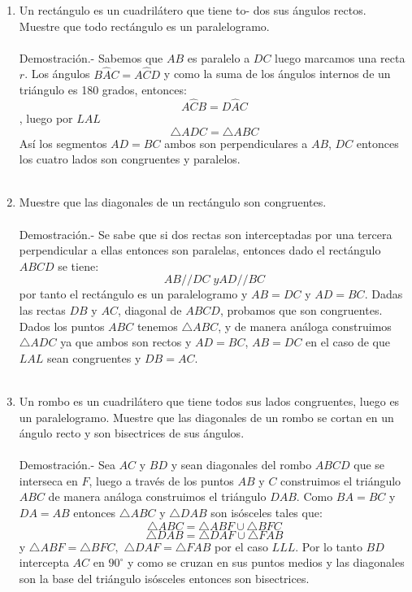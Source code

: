 \documentclass[10pt]{article}
\begin{document}
\begin{enumerate}
\item Un rectángulo es un cuadrilátero que tiene to- dos sus ángulos rectos. Muestre que todo rectángulo es un paralelogramo.\\\\
    Demostración.-\; Sabemos que $AB$ es paralelo a $DC$ luego marcamos una recta $r$. Los ángulos $B\widehat{A}C=A\widehat{C}D$ y como la suma de los ángulos internos de un triángulo es 180 grados, entonces: $$A\widehat{C}B=D\widehat{A}C$$, luego por $LAL$ $$\triangle ADC = \triangle ABC$$ Así los segmentos $AD = BC$  ambos son perpendiculares a $AB$, $DC$ entonces los cuatro lados son congruentes y paralelos.\\\\

\item Muestre que las diagonales de un rectángulo son congruentes.\\\\
    Demostración.-\; Se sabe que si dos rectas son interceptadas por una tercera perpendicular a ellas entonces son paralelas, entonces dado el rectángulo $ABCD$ se tiene: $$AB//DC \; y AD//BC$$ por tanto el rectángulo es un paralelogramo y $AB = DC$ y $AD = BC.$ Dadas las rectas $DB$ y $AC$, diagonal de $ABCD$, probamos que son congruentes.\\
    Dados los puntos $ABC$ tenemos $\triangle ABC$, y de manera análoga construimos $\triangle ADC$ ya que ambos son rectos y $AD = BC$, $AB = DC$ en el caso de que $LAL$ sean congruentes y $DB = AC$.\\\\

\item  Un rombo es un cuadrilátero que tiene todos sus lados congruentes, luego es un paralelogramo. Muestre que las diagonales de un rombo  se cortan en un ángulo recto y son bisectrices de sus ángulos.\\\\
    Demostración.-\; Sea $AC$ y $BD$ y sean diagonales del rombo $ABCD$ que se interseca en $F$, luego a través de los puntos $AB$ y $C$ construimos el triángulo $ABC$ de manera análoga construimos el triángulo $DAB$. Como $BA = BC$ y $DA = AB$ entonces $\triangle ABC$ y $\triangle DAB$ son isósceles tales que: $$\triangle ABC = \triangle ABF \cup \triangle BFC$$ $$\triangle DAB = \triangle DAF \cup \triangle FAB$$ y $\triangle ABF=\triangle BFC,$ $\triangle DAF = \triangle FAB$ por el caso $LLL$. Por lo tanto $BD$ intercepta $AC$ en $90^{\circ}$ y como se cruzan en sus puntos medios y las diagonales son la base del triángulo isósceles entonces son bisectrices.\\\\


\end{enumerate}
\end{document}
